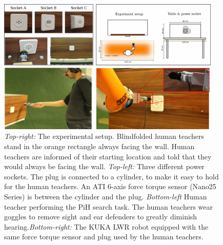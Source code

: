 \begin{figure}[h]
  \centering
  \includegraphics[width=0.95\textwidth]{./ch4-PiH/Figures/Fig/ex_setup_no_data.pdf}
     \caption{\textit{Top-right:} The experimental setup. Blindfolded human teachers stand in the orange rectangle always 
   facing the wall. Human teachers are informed of their starting location and told that 
   they would always be facing the wall. \textit{Top-left:} Three different power sockets. The plug is connected
   to a cylinder, to make it easy to hold for the human teachers. An ATI 6-axis force torque sensor (Nano25 Series)
   is between the cylinder and the plug. \textit{Bottom-left} Human teacher performing the PiH search task. 
   The human teachers wear goggles to remove sight and ear defenders to greatly diminish 
   hearing.\textit{Bottom-right:} The KUKA LWR robot equipped with the same force torque sensor and plug 
   used by the human teachers.}
  \label{fig:experiment_setup}
\end{figure}

